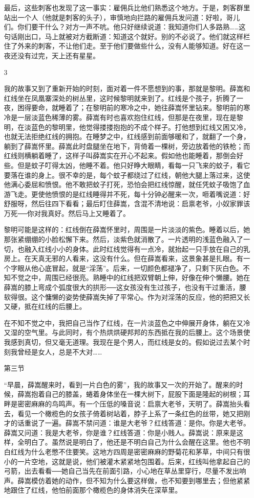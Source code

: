 最后，这些刺客也发现了这一事实：雇佣兵比他们熟悉这个地方。于是，刺客群里站出一个人（他就是刺客的头子），审慎地向拦路的雇佣兵发问道：好啦，哥儿们。你们要干什么？对方一声不吭。他只好继续说道：我知道你们人多路熟……这句话刚出口，马上就被对方截断道：知道这个就好。别的不必说了。他们就这样栏住了外来的刺客，不让他们走。至于他们要做些什么，没有人能够知道。好在这一夜还没有过完，天上还有星星。 

3 

我的故事又到了重新开始的时刻，面对着一件不愿想到的事，那就是黎明。薛嵩和红线坐在凤凰寨深处的树丛里，这时候黎明就来到了。红线是个孩子，折腾了一夜，困得要命，就睡着了；在黎明前的寒冷之中，她往薛嵩怀里钻来。黎明前的寒冷是一层淡蓝色稀薄的雾。薛嵩有时也喜欢抱住红线，但那是在夜里，现在是黎明，在淡蓝色的黎明里，他觉得搂搂抱抱的不成个样子。打他想到红线又困又冷，也就无法拒绝红线的拥抱。在睡梦之中，红线感到前面够暖和了，就翻了一个身，躺到了薛嵩怀里。薛嵩此时盘腿坐在地下，背倚着一棵树，旁边放着他的铁枪；而红线则横躺着睡了，这样子叫薛嵩实在开心不起来。假如他也能睡着，那倒会好些。但是蚊子叮得太凶，他睡不着。他只好睁大眼睛，看每一只飞来的蚊子，看它要落在谁的身上。很不幸的是，每个蚊子都绕过了红线，朝他大腿上落过来，这使他满心委屈和愤恨。他不敢把蚊子打死，恐怕会把红线惊醒，就任凭蚊子吸饱了血游飞走。更使他愤恨的是红线睡得并不死，每十分钟必醒来一次，咂着嘴说道：好舒服呀，然后往四下看看；最后盯住薛嵩，含混不清地说：启禀老爷，小奴家罪该万死──你对我真好。然后马上又睡着了。 

黎明可能是这样的：红线倒在薛嵩怀里时，周围是一片淡淡的紫色。睡着以后，她那张紧绷绷的小脸松懈下来。然后，淡紫色就消散了。一片透明的浅蓝色融入了一切，也融入红线小小的身体。此时红线觉得有一点冷，就抬起一只手放在自己的乳房上。在天真无邪的人看来，这没有什么。但在薛嵩看来，这景象甚是扎眼。有一个字眼从他心底冒起，就是“淫荡”。后来，一切颜色都褪净了，只剩下灰白色。不知不觉之中，周围已经很亮。熟睡中的红线把双臂朝上伸，好像在伸个懒腰。她在薛嵩的膝上弯成个弧度很大的拱形──这女孩没有生过孩子，也没有干过重活，腰软得很。这个慵懒的姿势使薛嵩失掉了平常心。作为对淫荡的反应，他的把把又长又硬，抵在红线的后腰上。 

在不知不觉之中，我把自己当作了红线，在一片淡蓝色之中伸展开身体，躺在又冷又湿的空气里。与此同时，有个热烘烘硬邦邦的东西抵在我的后腰上。这个场景使我感到真切，但又毫无道理。我现在是个男人，而红线是女的。假如说过去某个时刻我曾经是女人，总是不大对…… 

第三节 

“早晨，薛嵩醒来时，看到一片白色的雾”，我的故事又一次的开始了。醒来的时候，薛嵩抱着自己的膝盖，蜷着身体坐在一棵大树下，屁股下面是隆起的树根；耳畔是密密麻麻的鸟鸣声。有一个压低的嗓音说：启禀大老爷，天明了。薛嵩抬头看去，看见一个橄榄色的女孩子倚着树站着，脖子上系了一条红色的丝带，她又把刚才的话重说了一遍。薛嵩不禁问道：谁是大老爷？红线答道：是你。你是大老爷。薛嵩又问道：我是大老爷，你是谁？红线答道：你是小贱人。薛嵩说：原来是这样，全明白了。虽然说是明白了，他还是不明白自己为什么会醒在这里。他也不明白红线为什么老憋不住要笑。这地方四周是密密麻麻的野菊花和茅草，中间只有很小的一片空地，这就是说，他们被灌木紧紧地包围着。后来，红线叫他拿起自己的弓箭，出去看看──她自己当先在前面引路，小心地在草丛里穿行，尽量不发出响声。薛嵩模仿着她的动作，但不知为什么要这样做，也不知要到哪里去；但他紧紧地跟住了红线，他怕前面那个橄榄色的身体消失在深草里。 

